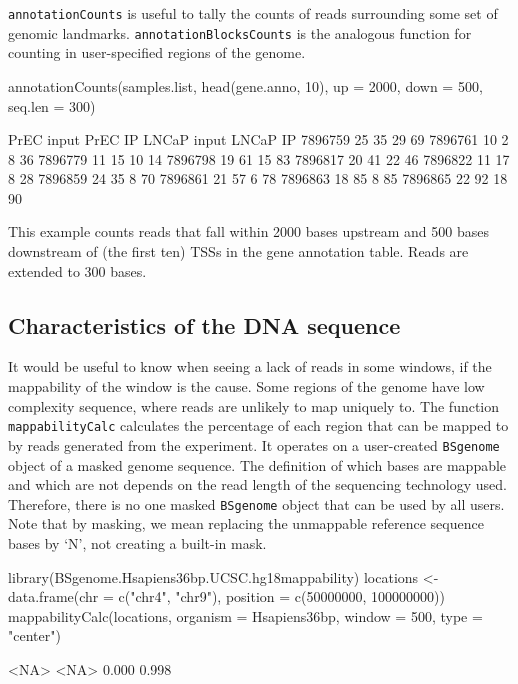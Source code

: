\texttt{annotationCounts} is useful to tally the counts of reads surrounding some set of genomic landmarks. \texttt{annotationBlocksCounts} is the analogous function for counting in user-specified regions of the genome.

\begin{Schunk}
\begin{Sinput}
 annotationCounts(samples.list, head(gene.anno, 10), up = 2000, down = 500,
                  seq.len = 300)
\end{Sinput}
\begin{Soutput}
        PrEC input PrEC IP LNCaP input LNCaP IP
7896759         25      35          29       69
7896761         10       2           8       36
7896779         11      15          10       14
7896798         19      61          15       83
7896817         20      41          22       46
7896822         11      17           8       28
7896859         24      35           8       70
7896861         21      57           6       78
7896863         18      85           8       85
7896865         22      92          18       90
\end{Soutput}
\end{Schunk}
	
\noindent This example counts reads that fall within 2000 bases upstream and 500 bases downstream of (the first ten) TSSs in the gene annotation table.  Reads are extended to 300 bases.

\subsection{Characteristics of the DNA sequence}
It would be useful to know when seeing a lack of reads in some windows, if the mappability of the window is the cause. Some regions of the genome have low complexity sequence, where reads are unlikely to map uniquely to. The function \texttt{mappabilityCalc} calculates the percentage of each region that can be mapped to by reads generated from the experiment. It operates on a user-created \texttt{BSgenome} object of a masked genome sequence. The definition of which bases are mappable and which are not depends on the read length of the sequencing technology used. Therefore, there is no one masked \texttt{BSgenome} object that can be used by all users. Note that by masking, we mean replacing the unmappable reference sequence bases by `N', not creating a built-in mask.

\begin{Schunk}
\begin{Sinput}
 library(BSgenome.Hsapiens36bp.UCSC.hg18mappability)
 locations <- data.frame(chr = c("chr4", "chr9"),
                         position = c(50000000, 100000000))
 mappabilityCalc(locations, organism = Hsapiens36bp, window = 500, type = "center")
\end{Sinput}
\begin{Soutput}
 <NA>  <NA> 
0.000 0.998 
\end{Soutput}
\end{Schunk}

